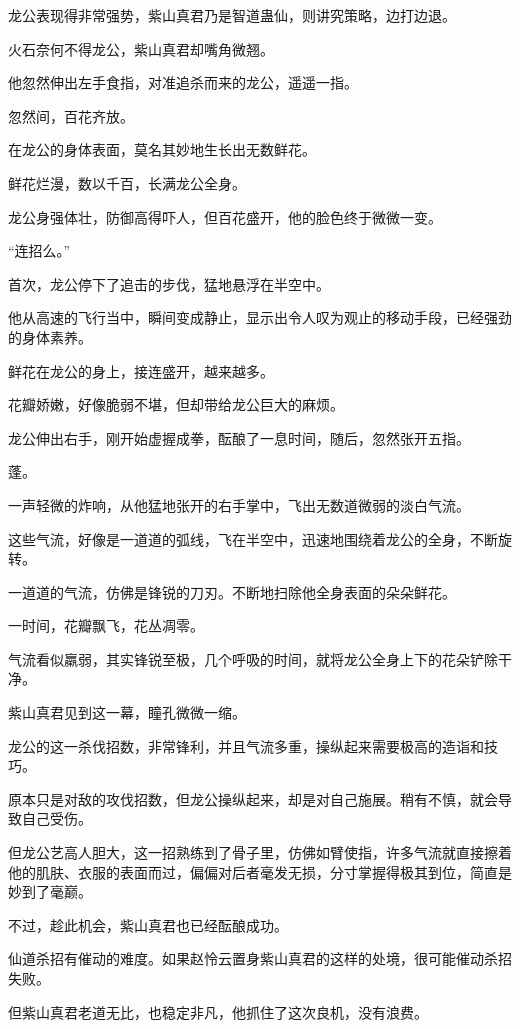 \begin{this_body}
龙公表现得非常强势，紫山真君乃是智道蛊仙，则讲究策略，边打边退。

火石奈何不得龙公，紫山真君却嘴角微翘。

他忽然伸出左手食指，对准追杀而来的龙公，遥遥一指。

忽然间，百花齐放。

在龙公的身体表面，莫名其妙地生长出无数鲜花。

鲜花烂漫，数以千百，长满龙公全身。

龙公身强体壮，防御高得吓人，但百花盛开，他的脸色终于微微一变。

“连招么。”

首次，龙公停下了追击的步伐，猛地悬浮在半空中。

他从高速的飞行当中，瞬间变成静止，显示出令人叹为观止的移动手段，已经强劲的身体素养。

鲜花在龙公的身上，接连盛开，越来越多。

花瓣娇嫩，好像脆弱不堪，但却带给龙公巨大的麻烦。

龙公伸出右手，刚开始虚握成拳，酝酿了一息时间，随后，忽然张开五指。

蓬。

一声轻微的炸响，从他猛地张开的右手掌中，飞出无数道微弱的淡白气流。

这些气流，好像是一道道的弧线，飞在半空中，迅速地围绕着龙公的全身，不断旋转。

一道道的气流，仿佛是锋锐的刀刃。不断地扫除他全身表面的朵朵鲜花。

一时间，花瓣飘飞，花丛凋零。

气流看似羸弱，其实锋锐至极，几个呼吸的时间，就将龙公全身上下的花朵铲除干净。

紫山真君见到这一幕，瞳孔微微一缩。

龙公的这一杀伐招数，非常锋利，并且气流多重，操纵起来需要极高的造诣和技巧。

原本只是对敌的攻伐招数，但龙公操纵起来，却是对自己施展。稍有不慎，就会导致自己受伤。

但龙公艺高人胆大，这一招熟练到了骨子里，仿佛如臂使指，许多气流就直接擦着他的肌肤、衣服的表面而过，偏偏对后者毫发无损，分寸掌握得极其到位，简直是妙到了毫巅。

不过，趁此机会，紫山真君也已经酝酿成功。

仙道杀招有催动的难度。如果赵怜云置身紫山真君的这样的处境，很可能催动杀招失败。

但紫山真君老道无比，也稳定非凡，他抓住了这次良机，没有浪费。


\end{this_body}

